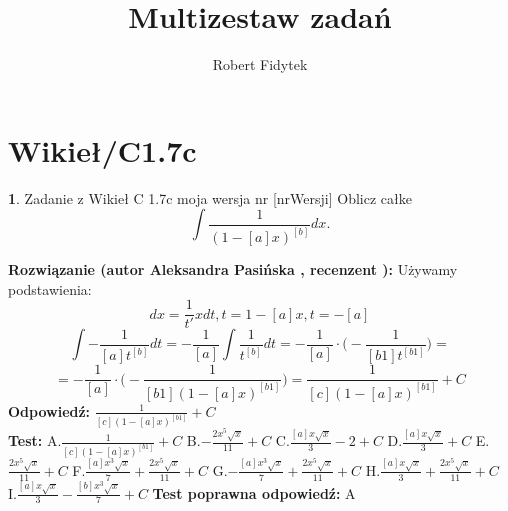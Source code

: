 \documentclass[12pt, a4paper]{article}
\title{Multizestaw zadań}
\author{Robert Fidytek}
\date{}
\theoremstyle{definition} %
\newtheorem{zad}{}
\newcommand{\kategoria}[1]{\section{#1}} %
\newcommand{\zadStart}[1]{\begin{zad}#1\newline} %
\newcommand{\zadStop}{\end{zad}}   %
\newcommand{\rozwStart}[2]{\noindent \textbf{Rozwiązanie (autor #1 , recenzent #2): }\newline} %
\newcommand{\rozwStop}{\newline}                                            %
\newcommand{\odpStart}{\noindent \textbf{Odpowiedź:}\newline}    %
\newcommand{\odpStop}{\newline}                                             %
\newcommand{\testStart}{\noindent \textbf{Test:}\newline} %
\newcommand{\testStop}{\newline} %
\newcommand{\kluczStart}{\noindent \textbf{Test poprawna odpowiedź:}\newline} %
\newcommand{\kluczStop}{\newline} %
\begin{document}
\maketitle


\kategoria{Wikieł/C1.7c}
\zadStart{Zadanie z Wikieł C 1.7c moja wersja nr [nrWersji]}
Oblicz całke $$\int \frac{1}{(1-[a]x)^{[b]}}dx.$$
\zadStop
\rozwStart{Aleksandra Pasińska}{}
Używamy podstawienia:
$$dx=\frac{1}{t'}xdt,t=1-[a]x, t=-[a]$$
$$\int -\frac{1}{[a]t^{[b]}}dt=-\frac{1}{[a]}\int \frac{1}{t^{[b]}}dt=-\frac{1}{[a]}\cdot \bigg(-\frac{1}{[b1]t^{[b1]}}\bigg)=$$
$$=-\frac{1}{[a]}\cdot \bigg(-\frac{1}{[b1](1-[a]x)^{[b1]}}\bigg)=\frac{1}{[c](1-[a]x)^{[b1]}}+C$$
\rozwStop
\odpStart
$\frac{1}{[c](1-[a]x)^{[b1]}}+C$\\
\odpStop
\testStart
A.$\frac{1}{[c](1-[a]x)^{[b1]}}+C$
B.$-\frac{2x^5\sqrt{x}}{11}+C$
C.$\frac{[a]x\sqrt{x}}{3}-2+C$
D.$\frac{[a]x\sqrt{x}}{3}+C$
E.$\frac{2x^5\sqrt{x}}{11}+C$
F.$\frac{[a]x^3\sqrt{x}}{7}+\frac{2x^5\sqrt{x}}{11}+C$
G.$-\frac{[a]x^3\sqrt{x}}{7}+\frac{2x^5\sqrt{x}}{11}+C$
H.$\frac{[a]x\sqrt{x}}{3}+\frac{2x^5\sqrt{x}}{11}+C$
I.$\frac{[a]x\sqrt{x}}{3}-\frac{[b]x^3\sqrt{x}}{7}+C$
\testStop
\kluczStart
A
\kluczStop
\end{document}
